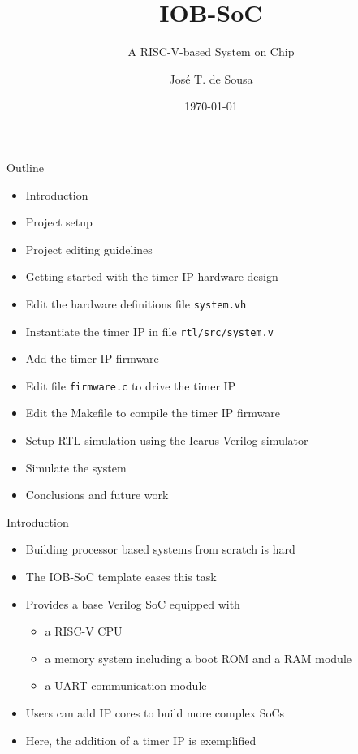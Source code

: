 \documentclass [xcolor=svgnames, t] {beamer}
\title[IOB-SoC Presentation]{IOB-SoC}
\subtitle{A RISC-V-based System on Chip}
\institute[IObundle Lda]{IObundle Lda.\\The Architecture for an Agile World}
\author[José T. de Sousa]{Jos\'e T. de Sousa}
\institute[IObundle Lda]{IObundle Lda}
\date{\today}
\begin{document}
\begin{frame}
 \titlepage   
\end{frame}


\begin{frame}{Outline}
\begin{center}
   \begin{itemize}
     \item Introduction
     \item Project setup
     \item Project editing guidelines
     \item Getting started with the timer IP hardware design
     \item Edit the hardware definitions file {\tt system.vh}
     \item Instantiate the timer IP in file {\tt rtl/src/system.v}
     \item Add the timer IP firmware
     \item Edit file {\tt firmware.c} to drive the timer IP
     \item Edit the Makefile to compile the timer IP firmware
     \item Setup RTL simulation using the Icarus Verilog simulator
     \item Simulate the system
     \item Conclusions and future work
 \end{itemize} 
\end{center}
\end{frame}


\begin{frame}{Introduction}
\begin{center}
    \begin{itemize}
      \item Building processor based systems from scratch is hard
      \item The IOB-SoC template eases this task
      \item Provides a base Verilog SoC equipped with
        \begin{itemize}
        \item a RISC-V CPU
        \item a memory system including a boot ROM and a RAM module
        \item a UART communication module
        \end{itemize}
      \item Users can add IP cores to build more complex SoCs
      \item Here, the addition of a timer IP is exemplified
    \end{itemize}
\end{center}
\end{frame}
\end{document}
